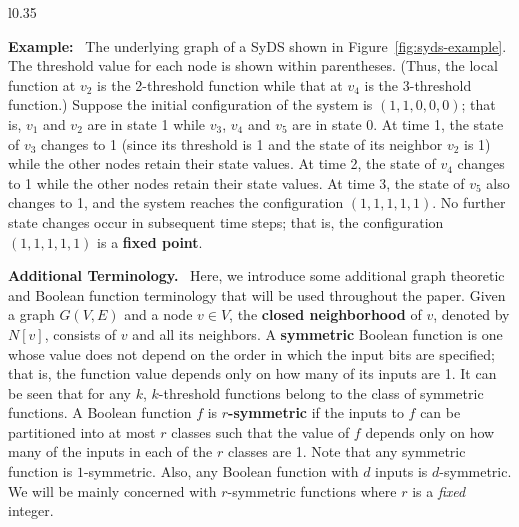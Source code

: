 \smallskip

\begin{wrapfigure}[16]{l}{0.35\textwidth}
\centering

\caption{\small{An Example of a SyDS where each node has a
threshold function. The threshold values are shown in parentheses.}}
\label{fig:syds-example}
\smallskip
\end{wrapfigure}

\noindent
\textbf{Example:}~
The underlying graph of a SyDS shown in
Figure~\ref{fig:syds-example}.
The threshold value for each node is shown within parentheses. 
(Thus, the local function at $v_2$ is the 2-threshold function
while that at $v_4$ is the 3-threshold function.)
Suppose the initial configuration of the system is $(1, 1, 0, 0, 0)$;
that is,
$v_1$ and $v_2$ are in state 1 while 
$v_3$, $v_4$ and $v_5$ are in state 0. 
At time 1, the state of $v_3$ changes to 1 (since its threshold is 1
and the state of its neighbor $v_2$ is 1) while
the other nodes retain their state values.
At time 2, the state of $v_4$ changes to 1 
while the other nodes retain their state values.
At time 3, the state of $v_5$ also changes to 1,
and the system reaches the configuration $(1, 1, 1, 1, 1)$.
No further state changes occur in subsequent time steps;
that is, the configuration $(1, 1, 1, 1, 1)$ is a \textbf{fixed point}.

\smallskip


\smallskip

\noindent
\textbf{Additional Terminology.}~ Here, we introduce some additional
graph theoretic and Boolean function terminology that will be used 
throughout the paper. 
Given a graph $G(V,E)$ and a node $v \in V$, the \textbf{closed neighborhood}
of $v$, denoted by $N[v]$, consists of $v$ and all its neighbors.
A \textbf{symmetric} Boolean function \cite{Crama-Hammer-2011}  is one whose
value does not depend on the order in
which the input bits are specified;
that is, the function value depends only on how many
of its inputs are 1.
It can be seen that for any $k$, $k$-threshold functions belong to the 
class of symmetric functions.
A Boolean function $f$ is \textbf{$r$-symmetric} \cite{BH+07}
if the inputs to $f$ can be partitioned into at most $r$ classes
such that the value of $f$ depends only on how many of the
inputs in each of the $r$ classes are 1.
Note that any symmetric function is $1$-symmetric.
Also, any Boolean function with $d$ inputs is $d$-symmetric.
We will be mainly concerned with $r$-symmetric functions 
where $r$ is a \emph{fixed} integer.

